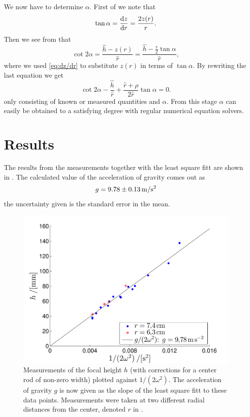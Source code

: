 \documentclass[11pt,towcolumn, swedish, english]{article}
\begin{document}
We now have to determine $\alpha$. First of we note that
\begin{equation}\label{eq:dz/dr}
\tan\alpha=\dv{z}{r} =\frac{2 z(r)}{r}.
\end{equation}
Then we see from  that 
\begin{equation}
\cot 2\alpha =\frac{\hat{h} - z(r)}{\hat{r}} 
= \frac{\hat{h}-\frac{r}{2}\tan\alpha }{\hat{r}},
\end{equation}
where we used \eqref{eq:dz/dr} to substitute $z(r)$ in terms of
$\tan\alpha$. By rewriting the last equation we get
\begin{equation}
\cot 2\alpha 
-\frac{\hat{h}}{\hat{r}}
+\frac{\hat{r}+\rho}{2\hat{r}}\tan\alpha  = 0.
\end{equation}
only consisting of known or measured quantities and $\alpha$. From
this stage $\alpha$ can easily be obtained to a satisfying degree with
regular numerical equation solvers.



\section{Results}
The results from the measurements together with the least square fitt
are shown in . The calculated value of the
acceleration of gravity comes out as
\begin{equation}
g=\unit[9.78\pm 0.13]{m/s^2}
\end{equation}
the uncertainty given is the standard error in the mean.


\begin{figure}\centering 
\includegraphics[width=.8\linewidth]{g_minsta_kvadrat.pdf}
\caption{\label{fig:data} Measurements of the focal height $h$ (with
  corrections for a center rod of non-zero width) plotted against
  $1/(2\omega^2)$. The acceleration of gravity $g$ is now given as the
  slope of the least square fitt to these data points. Measurements
  were taken at two different radial distances from the center,
  denoted $r$ in .
}
\end{figure}
\end{document}
